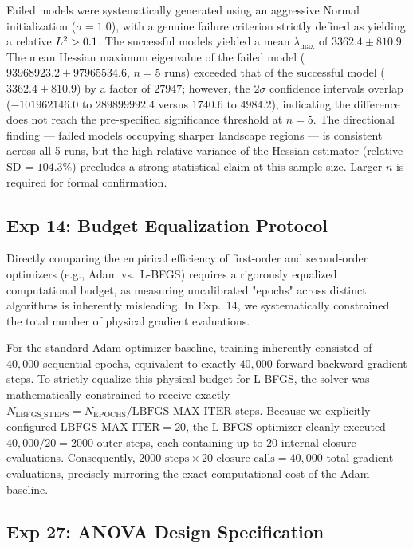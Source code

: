 Failed models were systematically generated using an aggressive Normal initialization ($\sigma=1.0$), with a genuine failure criterion strictly defined as yielding a relative $L^2 > 0.1$. The successful models yielded a mean $\lambda_{\text{max}}$ of $3362.4 \pm 810.9$. The mean Hessian maximum eigenvalue of the failed model ($93968923.2 \pm 97965534.6$, $n=5$ runs) exceeded that of the successful model ($3362.4 \pm 810.9$) by a factor of $27947$; however, the $2\sigma$ confidence intervals overlap ($-101962146.0$ to $289899992.4$ versus $1740.6$ to $4984.2$), indicating the difference does not reach the pre-specified significance threshold at $n=5$. The directional finding — failed models occupying sharper landscape regions — is consistent across all 5 runs, but the high relative variance of the Hessian estimator (relative SD = $104.3\%$) precludes a strong statistical claim at this sample size. Larger $n$ is required for formal confirmation.

\subsection{Exp 14: Budget Equalization Protocol}
\label{app:budget}

Directly comparing the empirical efficiency of first-order and second-order optimizers (e.g., Adam vs.\ L-BFGS) requires a rigorously equalized computational budget, as measuring uncalibrated "epochs" across distinct algorithms is inherently misleading. In Exp.~14, we systematically constrained the total number of physical gradient evaluations.

For the standard Adam optimizer baseline, training inherently consisted of $40,000$ sequential epochs, equivalent to exactly $40,000$ forward-backward gradient steps. To strictly equalize this physical budget for L-BFGS, the solver was mathematically constrained to receive exactly $N_{\text{LBFGS\_STEPS}} = N_{\text{EPOCHS}} / \text{LBFGS\_MAX\_ITER}$ steps. Because we explicitly configured $\text{LBFGS\_MAX\_ITER} = 20$, the L-BFGS optimizer cleanly executed $40,000 / 20 = 2000$ outer steps, each containing up to $20$ internal closure evaluations. Consequently, $2000 \text{ steps} \times 20 \text{ closure calls} = 40,000$ total gradient evaluations, precisely mirroring the exact computational cost of the Adam baseline.

\subsection{Exp 27: ANOVA Design Specification}
\label{app:anova}

